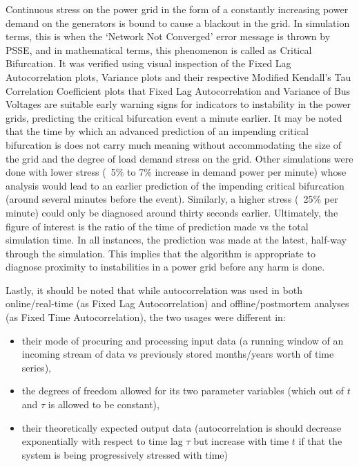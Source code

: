 \clearpage
Continuous stress on the power grid in the form of a constantly increasing power demand on the generators is bound to cause a blackout in the grid. In simulation terms, this is when the `Network Not Converged' error message is thrown by PSSE, and in mathematical terms, this phenomenon is called as Critical Bifurcation.
It was verified using visual inspection of the Fixed Lag Autocorrelation plots, Variance plots and their respective Modified Kendall's Tau Correlation Coefficient plots that Fixed Lag Autocorrelation and Variance of Bus Voltages are suitable early warning signs for indicators to instability in the power grids, predicting the critical bifurcation event a minute earlier. It may be noted that the time by which an advanced prediction of an impending critical bifurcation is does not carry much meaning without accommodating the size of the grid and the degree of load demand stress on the grid. Other simulations were done with lower stress (~5\% to 7\% increase in demand power per minute) whose analysis would lead to an earlier prediction of the impending critical bifurcation (around several minutes before the event). Similarly, a higher stress (~25\% per minute) could only be diagnosed around thirty seconds earlier.
Ultimately, the figure of interest is the ratio of the time of prediction made vs the total simulation time. In all instances, the prediction was made at the latest, half-way through the simulation. This implies that the algorithm is appropriate to diagnose proximity to instabilities in a power grid before any harm is done. 

Lastly, it should be noted that while autocorrelation was used in both online/real-time (as Fixed Lag Autocorrelation) and offline/postmortem analyses (as Fixed Time Autocorrelation), the two usages were different in:

\begin{itemize}
	\item their mode of procuring and processing input data (a running window of an incoming stream of data vs previously stored months/years worth of time series),
	\item the degrees of freedom allowed for its two parameter variables (which out of $t$ and $\tau$ is allowed to be constant),
	\item their theoretically expected output data (autocorrelation is should decrease exponentially with respect to time lag $\tau$ but increase with time $t$ if that the system is being progressively stressed with time)
\end{itemize} 
 
 